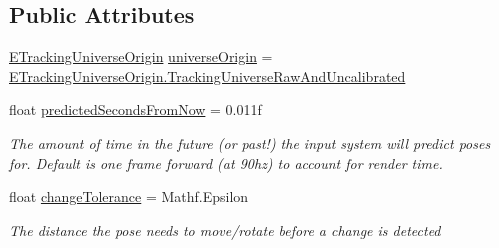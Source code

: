 \subsection*{Public Attributes}
\begin{DoxyCompactItemize}
\item 
\mbox{\hyperlink{namespace_valve_1_1_v_r_a29be99a3c2f780157bd490db06a7f12f}{E\+Tracking\+Universe\+Origin}} \mbox{\hyperlink{class_valve_1_1_v_r_1_1_steam_v_r___action___pose___source_a84921c535f9dbe0abdab0b905b383305}{universe\+Origin}} = \mbox{\hyperlink{namespace_valve_1_1_v_r_a29be99a3c2f780157bd490db06a7f12fa593c08eda033db867fc77728927d5554}{E\+Tracking\+Universe\+Origin.\+Tracking\+Universe\+Raw\+And\+Uncalibrated}}
\item 
float \mbox{\hyperlink{class_valve_1_1_v_r_1_1_steam_v_r___action___pose___source_ac19b14e1ae06d27a39a614cfa444bea8}{predicted\+Seconds\+From\+Now}} = 0.\+011f
\begin{DoxyCompactList}\small\item\em The amount of time in the future (or past!) the input system will predict poses for. Default is one frame forward (at 90hz) to account for render time. \end{DoxyCompactList}\item 
float \mbox{\hyperlink{class_valve_1_1_v_r_1_1_steam_v_r___action___pose___source_ac24988086bc9a48b2cd2ba3189795588}{change\+Tolerance}} = Mathf.\+Epsilon
\begin{DoxyCompactList}\small\item\em The distance the pose needs to move/rotate before a change is detected \end{DoxyCompactList}\end{DoxyCompactItemize}

